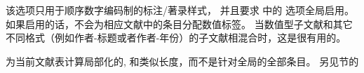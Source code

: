 \begin{optionlist*}


该选项只用于顺序数字编码制的标注/著录样式，
并且要求  中的  选项全局启用。
如果启用的话，\biblatex 不会为相应文献中的条目分配数值标签。
当数值型子文献和其它不同格式（例如作者-标题或者作者-年份）的子文献相混合时，这是很有用的。



为当前文献表计算局部化的, 和类似长度，而不是针对全局的全部条目。
另见节的


\end{optionlist*}

